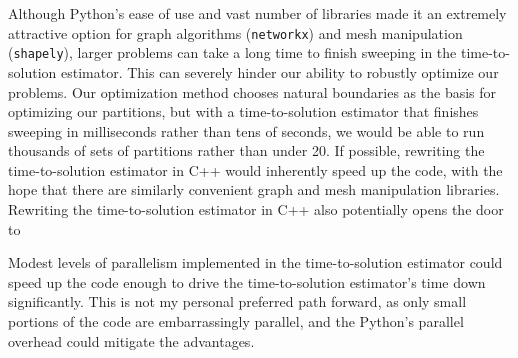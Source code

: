 Although Python's ease of use and vast number of libraries made it an extremely attractive option for graph algorithms ({\tt networkx}) and mesh manipulation ({\tt shapely}), larger problems can take a long time to finish sweeping in the time-to-solution estimator.
This can severely hinder our ability to robustly optimize our problems.
Our optimization method chooses natural boundaries as the basis for optimizing our partitions, but with a time-to-solution estimator that finishes sweeping in milliseconds rather than tens of seconds, we would be able to run thousands of sets of partitions rather than under 20.
If possible, rewriting the time-to-solution estimator in C++ would inherently speed up the code, with the hope that there are similarly convenient graph and mesh manipulation libraries.
Rewriting the time-to-solution estimator in C++ also potentially opens the door to

Modest levels of parallelism implemented in the time-to-solution estimator could speed up the code enough to drive the time-to-solution estimator's time down significantly.
This is not my personal preferred path forward, as only small portions of the code are embarrassingly parallel, and the Python's parallel overhead could mitigate the advantages.
